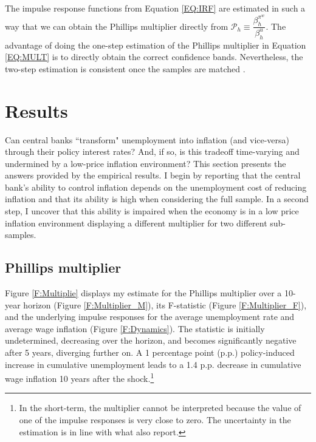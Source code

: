 \documentclass[12pt]{article}
\begin{document}
The impulse response functions from Equation \eqref{EQ:IRF} are estimated in such a way that we can obtain the Phillips multiplier directly from $\mathcal{P}_h \equiv \dfrac{\beta_h^{\pi^w}}{\beta_h^{u}}$. The advantage of doing the one-step estimation of the Phillips multiplier in Equation \eqref{EQ:MULT} is to directly obtain the correct confidence bands. Nevertheless, the two-step estimation is consistent once the samples are matched \citep{Ramey2018}.


\section{Results \label{S_Results}}

Can central banks ``transform" unemployment into inflation (and vice-versa) through their policy interest rates? And, if so, is this tradeoff time-varying and undermined by a low-price inflation environment? This section presents the answers provided by the empirical results. I begin by reporting that the central bank's ability to control inflation depends on the unemployment cost of reducing inflation and that its ability is high when considering the full sample. In a second step, I uncover that this ability is impaired when the economy is in a low price inflation environment displaying a different multiplier for two different sub-samples.

\subsection{Phillips multiplier}

Figure \ref{F:Multiplie} displays my estimate for the Phillips multiplier over a 10-year horizon (Figure \ref{F:Multiplier_M}), its F-statistic (Figure \ref{F:Multiplier_F}), and the underlying impulse responses for the average unemployment rate and average wage inflation (Figure \ref{F:Dynamics}). The statistic is initially undetermined, decreasing over the horizon, and becomes significantly negative after 5 years, diverging further on. A 1 percentage point (p.p.) policy-induced increase in cumulative unemployment leads to a 1.4 p.p. decrease in cumulative wage inflation 10 years after the shock.\footnote{In the short-term, the multiplier cannot be interpreted because the value of one of the impulse responses is very close to zero. The uncertainty in the estimation is in line with what \cite{Barnichon2019} also report.}
\end{document}

